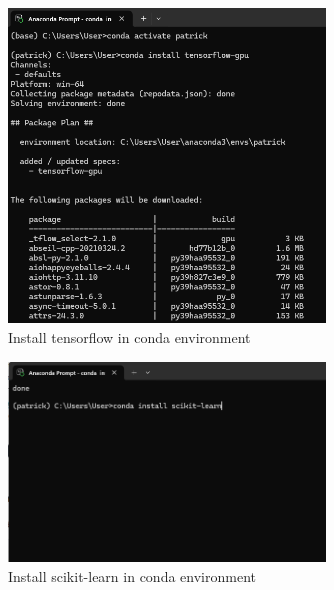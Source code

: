 \begin{ZhChapter}
\begin{figure}[htbp]
    \centering
    \includegraphics[width = 0.75\textwidth]{image/tensorflow.png}
    \caption{Install tensorflow in conda environment}
    \label{fig: tensorflow}
\end{figure}

\begin{figure}[htbp]
    \centering
    \includegraphics[width = 0.75\textwidth]{image/sklearn.png}
    \caption{Install scikit-learn in conda environment}
    \label{fig: sklearn}
\end{figure}


\end{ZhChapter}
